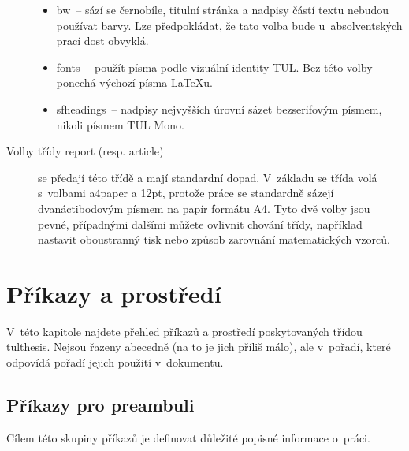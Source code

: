 \documentclass[fonts,numbering,twoside,margins]{./tulpackage/tulthesis}
\newcommand{\argument}[1]{{\ttfamily\color{\tulcolor}#1}}
\newcommand{\argumentindex}[1]{\argument{#1}\index{#1}}
\begin{document}
\begin{description}
\begin{itemize}
\item \argumentindex{bw}~-- sází se černobíle, titulní stránka a nadpisy částí
textu nebudou používat barvy. Lze předpokládat, že tato volba bude
u~absolventských prací dost obvyklá.

\item \argumentindex{fonts}~-- použít písma podle vizuální identity TUL. Bez
této volby ponechá výchozí písma \LaTeX u.

\item \argumentindex{sfheadings}~-- nadpisy nejvyšších úrovní sázet
bezserifovým písmem, nikoli písmem TUL Mono.

\end{itemize}

\item[Volby třídy \argument{report} (resp. \argument{article})] se předají této
třídě a mají standardní dopad. V~základu se třída volá s~volbami
\argument{a4paper} a \argument{12pt}, protože práce se standardně sázejí
dvanáctibodovým písmem na papír formátu A4. Tyto dvě volby jsou pevné,
případnými dalšími můžete ovlivnit chování třídy, například nastavit
oboustranný tisk nebo způsob zarovnání matematických vzorců.

\end{description}


\chapter{Příkazy a prostředí}

V~této kapitole najdete přehled příkazů a prostředí poskytovaných třídou
\argument{tulthesis}. Nejsou řazeny abecedně (na to je jich příliš málo), ale
v~pořadí, které odpovídá pořadí jejich použití v~dokumentu.


\section{Příkazy pro preambuli}\label{deklarace}

Cílem této skupiny příkazů je definovat důležité popisné informace o~práci.
\end{document}
